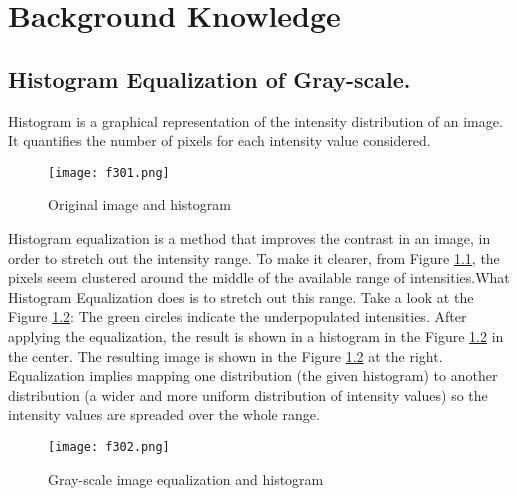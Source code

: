 
\chapter{Background Knowledge} %

\label{Chapter3} %



\section{Histogram Equalization of Gray-scale.}\label{sec:3.1}

Histogram is a graphical representation of the intensity distribution of an image. It quantifies the number of pixels for each intensity value considered.
\begin{figure}[t]
	\centering
	\texttt{[image: f301.png]}
	\caption{Original image and histogram}
	\label{fig:f301}
\end{figure}
Histogram equalization is a method that improves the contrast in an image, in order to stretch out the intensity range. To make it clearer, from Figure \ref{fig:f301}, the pixels seem clustered around the middle of the available range of intensities.What Histogram Equalization does is to stretch out this range. Take a look at the Figure \ref{fig:f302}: The green circles indicate the underpopulated intensities. After applying the equalization, the result is shown in a histogram in the Figure \ref{fig:f302} in the center. The resulting image is shown in the Figure \ref{fig:f302} at the right. Equalization implies mapping one distribution (the given histogram) to another distribution (a wider and more uniform distribution of intensity values) so the intensity values are spreaded over the whole range.


\begin{figure}[t]
	\centering
	\texttt{[image: f302.png]}
	\caption{Gray-scale image equalization and histogram}
	\label{fig:f302}
\end{figure}

